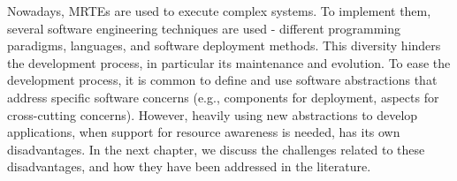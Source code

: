 Nowadays, MRTEs are used to execute complex systems.
To implement them, several software engineering techniques are used - different programming paradigms, languages, and software deployment methods.
This diversity hinders the development process, in particular its maintenance and evolution.
To ease the development process, it is common to define and use software abstractions that address specific software concerns (e.g., components for deployment, aspects for cross-cutting concerns).
However, heavily using new abstractions to develop applications, when support for resource awareness is needed, has its own disadvantages.
In the next chapter, we discuss the challenges related to these disadvantages, and how they have been addressed in the literature.  


%
%
%
%
%
%
%
%
%
%
